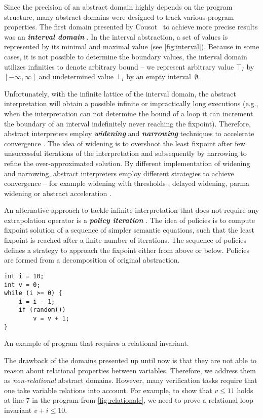 Since the precision of an abstract domain highly depends on the program
structure, many abstract domains were designed to track various program
properties. The first domain presented by Cousot~\cite{Cousot1977} to
achieve more precise results was an \textbf{\emph{interval domain}} .
In the interval abstraction, a set of values is represented by its minimal and
maximal value (see \autoref{fig:interval}).  Because in some cases, it is not
possible to determine the boundary values, the interval domain utilizes
infinities to denote arbitrary bound -- we represent arbitrary value
$\top_{\textit{I}}$ by $[-\infty, \infty]$ and undetermined value
$\bot_{\textit{I}}$ by an empty interval~$\emptyset$.

Unfortunately, with the infinite lattice of the interval
domain, the
abstract interpretation will obtain a possible infinite or impractically long
executions (e.g., when the interpretation can not determine the bound of a loop
it can increment the boundary of an interval indefinitely never reaching the
fixpoint). Therefore, abstract interpreters employ \textbf{\emph{widening}} and
\textbf{\emph{narrowing}} techniques to accelerate convergence \cite{Cousot1992a,
Cortesi2011}.  The idea of wi\-de\-ning is to overshoot the least fixpoint
after few unsuccessful iterations of the interpretation and subsequently by
narrowing to refine the over-approximated solution. By different implementation
of widening and narrowing, abstract interpreters employ different strategies to
achieve convergence -- for example widening with thresholds \cite{Blanchet2003,
Lakhdar2011}, delayed widening, parma widening \cite{Bagnara2008} or abstract
acceleration \cite{Gonnord2006, Feautrier2010}.

An alternative approach to tackle infinite interpretation that does not require
any extrapolation operator is a \textbf{\emph{policy iteration}}
\cite{Costan2005, Gaubert2007, Gawlitza2007, Gawlitza2007b, Gawlitza2011}. The
idea of policies is to compute fixpoint solution of a sequence of simpler
semantic equations, such that the least fixpoint is reached after a finite
number of iterations.  The sequence of policies defines a strategy to approach
the fixpoint either from above or below. Policies are formed from a
decomposition of original abstraction.

\begin{marginfigure}
\begin{verbatim}
int i = 10;
int v = 0;
while (i >= 0) {
    i = i - 1;
    if (random())
        v = v + 1;
}
\end{verbatim}
    \caption{An example of program that requires a relational invariant.}
    \label{fig:relationalc}
\end{marginfigure}
The drawback of the domains presented up until now is that they are not able to reason about
relational properties between variables. Therefore, we address them as
\emph{non-relational} abstract domains.  However, many verification tasks
require that one take variable relations into account.  For example, to show that $v \leq 11$
holds at line 7 in the program from \autoref{fig:relationalc}, we need to prove
a relational loop invariant $v + i
\leq 10$.

